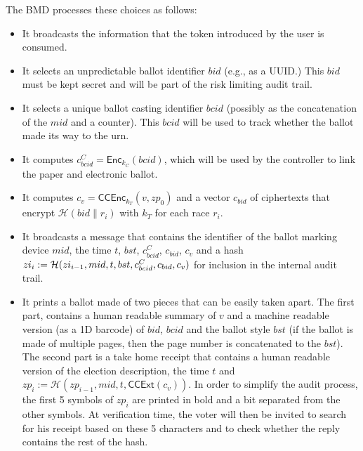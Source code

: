 \documentclass[prodmode]{acmsmall}
\newcommand{\COP}[1]{{\sf [[OP: #1]]}}
\newcommand{\kt}{\ensuremath{k_T}\xspace}
\newcommand{\kc}{\ensuremath{k_C}\xspace}
\newcommand{\zp}{\ensuremath{zp}\xspace}
\newcommand{\zi}{\ensuremath{zi}\xspace}
\newcommand{\bst}{\ensuremath{bst}\xspace}   %
\newcommand{\bid}{\ensuremath{bid}\xspace}   %
\newcommand{\bcid}{\ensuremath{bcid}\xspace} %
\newcommand{\bmd}{\textsf{BMD}\xspace}       %
\newcommand{\bmdid}{\ensuremath{mid}\xspace} %
\newcommand{\Enc}[2]{\textsf{Enc}_{#1}(#2)\xspace} %
\newcommand{\CCEnc}[2]{\textsf{CCEnc}_{#1}(#2)\xspace} %
\newcommand{\CCExt}[1]{\textsf{CCExt}(#1)\xspace} %
\newcommand{\hash}{\ensuremath{\mathcal{H}}\xspace} %
\newcommand{\vote}{\ensuremath{v}\xspace} %
\newcommand{\cv}{\ensuremath{c_v}\xspace} %
\newcommand{\cb}{\ensuremath{c_{\bid}}\xspace} %
\newcommand{\cbc}{\ensuremath{c^C_{\bcid}}\xspace} %
\begin{document}


The \bmd processes these choices as follows: 
\begin{itemize}
\item It broadcasts the information that the token introduced by the
  user is consumed.
\item It selects an unpredictable ballot identifier $\bid$ (e.g., as a
  UUID.) This \bid must be kept secret and will be part of the risk
  limiting audit trail.
\item It selects a unique ballot casting identifier \bcid
  (possibly as the concatenation of the \bmdid and a counter). This
  \bcid will be used to track whether the ballot made its way to the urn. 
\item It computes $\cbc = \Enc{\kc}{\bcid}$, which will be 
  used by the controller to link the paper and electronic ballot.
\item It computes $\cv = \CCEnc{\kt}{\vote, \zp_0}$ and a vector $\cb$
  of ciphertexts that encrypt $\hash(\bid \| r_i)$ with $\kt$ for each
  race $r_i$. 
\item It broadcasts a message that contains the identifier of the
  ballot marking device $\bmdid$, the time $t$, $\bst$, $\cbc$,
  $\cb$, $\cv$ and a hash $\zi_i := \hash(\zi_{i-1}, \bmdid, t,
  \bst, \linebreak[4] \cbc, \cb, \cv)$ for inclusion in the internal audit trail.
\item It prints a ballot made of two pieces that can be easily taken
  apart. The first part, contains a human readable summary of \vote
  and a machine readable version (as a 1D barcode) of $\bid$, $\bcid$
  and the ballot style $\bst$ (if the ballot is made of multiple
  pages, then the page number is concatenated to the $\bst$). The
  second part is a take home receipt that contains a human readable
  version of the election description, the time $t$ and $\zp_i :=
  \hash(\zp_{i-1}, \bmdid, t, \CCExt{\cv})$. In order to
  simplify the audit process, the first 5 symbols of $\zp_i$ are
  printed in bold and a bit separated from the other symbols. At
  verification time, the voter will then be invited to search for his
  receipt based on these 5 characters and to check whether the reply
  contains the rest of the hash.
\end{itemize}
\end{document}
